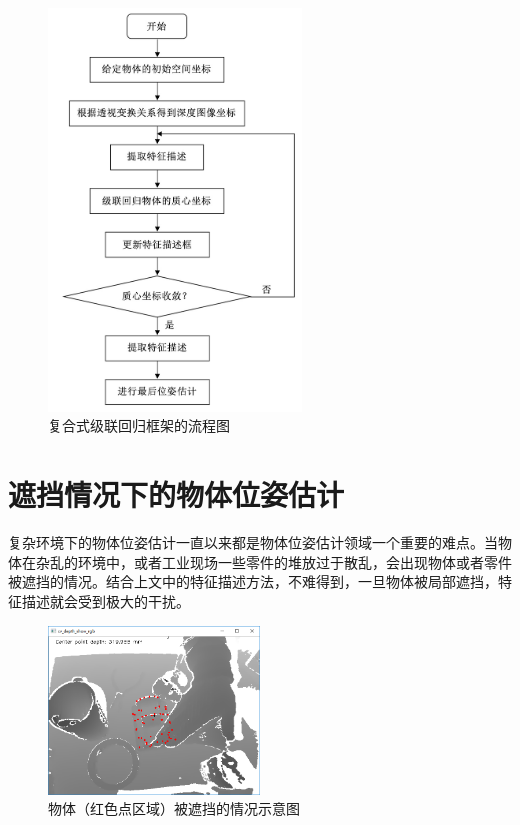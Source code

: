 \begin{figure}[htb]
	\centering 
	\includegraphics[width=0.6\textwidth]{./mypic/复合式级联回归框架的流程图.jpg} 
	\caption{复合式级联回归框架的流程图} 
\end{figure}


\section{遮挡情况下的物体位姿估计} %

复杂环境下的物体位姿估计一直以来都是物体位姿估计领域一个重要的难点。当物体在杂乱的环境中，或者工业现场一些零件的堆放过于散乱，会出现物体或者零件被遮挡的情况。结合上文中的特征描述方法，不难得到，一旦物体被局部遮挡，特征描述就会受到极大的干扰。

\begin{figure}[htb]
	\centering 
	\includegraphics[width=0.5\textwidth]{./mypic/物体存在被遮挡的情况.png} 
	\caption{物体（红色点区域）被遮挡的情况示意图} 
\end{figure}

